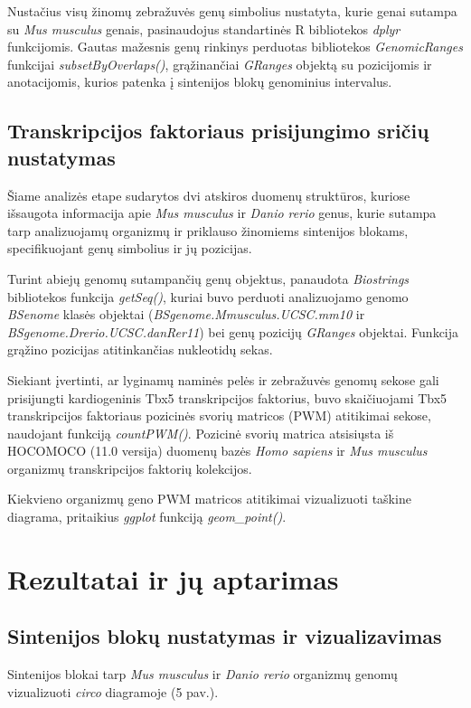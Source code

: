 \documentclass[12pt]{article}
\begin{document}
Nustačius visų žinomų zebražuvės genų simbolius nustatyta, kurie genai sutampa
su \emph{Mus musculus} genais, pasinaudojus standartinės R bibliotekos
\emph{dplyr}\cite{DPLYR} funkcijomis. Gautas mažesnis genų rinkinys perduotas
bibliotekos \emph{GenomicRanges}\cite{GRANGES} funkcijai
\emph{subsetByOverlaps()}, grąžinančiai \emph{GRanges} objektą su pozicijomis
ir anotacijomis, kurios patenka į sintenijos blokų genominius intervalus.

\subsection{Transkripcijos faktoriaus prisijungimo sričių nustatymas}
Šiame analizės etape sudarytos dvi atskiros duomenų struktūros, kuriose
išsaugota informacija apie \emph{Mus musculus} ir \emph{Danio rerio} genus,
kurie sutampa tarp analizuojamų organizmų ir priklauso žinomiems sintenijos
blokams, specifikuojant genų simbolius ir jų pozicijas.

Turint abiejų genomų sutampančių genų objektus, panaudota
\emph{Biostrings}\cite{BIOSTRINGS}
bibliotekos funkcija \emph{getSeq()}, kuriai buvo perduoti analizuojamo genomo
\emph{BSenome}\cite{BSGENOME} klasės objektai
(\emph{BSgenome.Mmusculus.UCSC.mm10} ir \emph{BSgenome.Drerio.UCSC.danRer11})
bei genų pozicijų \emph{GRanges} objektai. Funkcija grąžino pozicijas
atitinkančias nukleotidų sekas.

Siekiant įvertinti, ar lyginamų naminės pelės ir zebražuvės genomų sekose gali
prisijungti kardiogeninis Tbx5 transkripcijos faktorius, buvo skaičiuojami Tbx5
transkripcijos faktoriaus pozicinės svorių matricos (PWM) atitikimai sekose,
naudojant funkciją \emph{countPWM()}. Pozicinė svorių matrica atsisiųsta iš
HOCOMOCO\cite{HOCOMOCO} (11.0 versija) duomenų bazės \emph{Homo sapiens} ir
\emph{Mus musculus} organizmų transkripcijos faktorių kolekcijos.

Kiekvieno organizmų geno PWM matricos atitikimai vizualizuoti taškine diagrama,
pritaikius \emph{ggplot} funkciją \emph{geom\_point()}.

\newpage


\section{Rezultatai ir jų aptarimas}
\subsection{Sintenijos blokų nustatymas ir vizualizavimas}
Sintenijos blokai tarp \emph{Mus musculus} ir \emph{Danio rerio} organizmų
genomų vizualizuoti \emph{circo} diagramoje (5 pav.).
\end{document}
